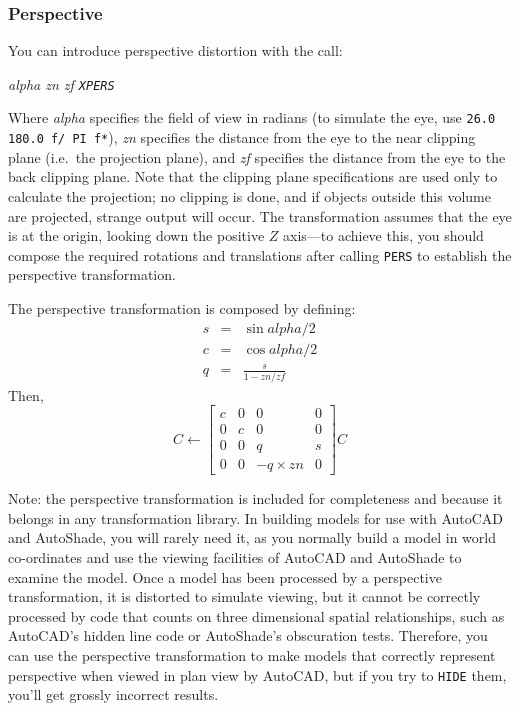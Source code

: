 \documentclass{article}
\begin{document}
\subsubsection{Perspective}

You can introduce perspective distortion with the call:

{\em alpha zn zf {\tt XPERS}}

Where {\em alpha} specifies the field of view in radians (to simulate
the eye, use {\tt 26.0 180.0 f/ PI f*}), {\em zn} specifies the
distance from the eye to the near clipping plane (i.e.\ the projection
plane), and {\em zf} specifies the distance from the eye to the back
clipping plane.  Note that the clipping plane specifications are used
only to calculate the projection; no clipping is done, and if objects
outside this volume are projected, strange output will occur.  The
transformation assumes that the eye is at the origin, looking down the
positive $Z$ axis---to achieve this, you should compose the required
rotations and translations after calling {\tt PERS} to establish the
perspective transformation.

The perspective transformation is composed by defining:
\begin{eqnarray*}
        s & =  &\sin \mathit{alpha} / 2\\
        c & =  &\cos \mathit{alpha} / 2\\
        q & = & \frac{s}{1-\mathit{zn}/\mathit{zf}}
\end{eqnarray*}
Then,
\[ C \leftarrow \left[ \begin{array}{cccc}
        c & 0 & 0 & 0 \\
        0 & c & 0 & 0 \\
        0 & 0 & q & s \\
        0 & 0 & -q\times \mathit{zn} & 0
\end{array} \right] C \]

Note: the perspective transformation is included for completeness and
because it belongs in any transformation library.  In building models
for use with AutoCAD and AutoShade, you will rarely need it, as you
normally build a model in world co-ordinates and use the viewing
facilities of AutoCAD and AutoShade to examine the model.  Once a
model has been processed by a perspective transformation, it is
distorted to simulate viewing, but it cannot be correctly processed by
code that counts on three dimensional spatial relationships, such as
AutoCAD's hidden line code or AutoShade's obscuration tests.
Therefore, you can use the perspective transformation to make models
that correctly represent perspective when viewed in plan view by
AutoCAD, but if you try to {\tt HIDE} them, you'll get grossly
incorrect results.
\end{document}
